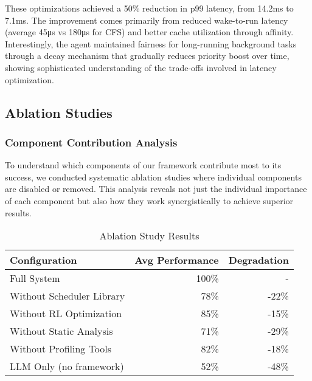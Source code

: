 These optimizations achieved a 50\% reduction in p99 latency, from 14.2ms to 7.1ms. The improvement comes primarily from reduced wake-to-run latency (average 45μs vs 180μs for CFS) and better cache utilization through affinity. Interestingly, the agent maintained fairness for long-running background tasks through a decay mechanism that gradually reduces priority boost over time, showing sophisticated understanding of the trade-offs involved in latency optimization.

\subsection{Ablation Studies}

\subsubsection{Component Contribution Analysis}

To understand which components of our framework contribute most to its success, we conducted systematic ablation studies where individual components are disabled or removed. This analysis reveals not just the individual importance of each component but also how they work synergistically to achieve superior results.

\begin{table}[h]
\caption{Ablation Study Results}
\label{tab:ablation}
\begin{tabular}{lrr}
\toprule
Configuration & Avg Performance & Degradation \\
\midrule
Full System & 100\% & - \\
Without Scheduler Library & 78\% & -22\% \\
Without RL Optimization & 85\% & -15\% \\
Without Static Analysis & 71\% & -29\% \\
Without Profiling Tools & 82\% & -18\% \\
LLM Only (no framework) & 52\% & -48\% \\
\bottomrule
\end{tabular}
\end{table}


